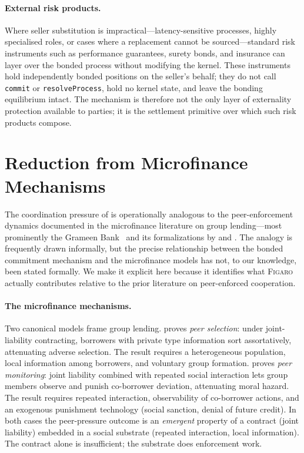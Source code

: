 \documentclass[11pt,a4paper]{article}
\theoremstyle{definition}
\theoremstyle{remark}
\newcommand{\figaro}{\textsc{Figaro}}
\begin{document}
\paragraph{External risk products.}
Where seller substitution is impractical---latency-sensitive
processes, highly specialised roles, or cases where a replacement
cannot be sourced---standard risk instruments such as performance
guarantees, surety bonds, and insurance can layer over the bonded
process without modifying the kernel. These instruments hold
independently bonded positions on the seller's behalf; they do not
call \texttt{commit} or \texttt{resolveProcess}, hold no kernel
state, and leave the bonding equilibrium intact. The mechanism is
therefore not the only layer of externality protection available to
parties; it is the settlement primitive over which such risk
products compose.

\section{Reduction from Microfinance Mechanisms}
\label{sec:microfinance}

The coordination pressure of  is
operationally analogous to the peer-enforcement dynamics documented
in the microfinance literature on group lending---most prominently
the Grameen Bank~\citep{grameen1999} and its formalizations by
\citet{ghatak1999} and \citet{stiglitz1990}. The analogy is frequently
drawn informally, but the precise relationship between the bonded
commitment mechanism and the microfinance models has not, to our
knowledge, been stated formally. We make it explicit here because
it identifies what \figaro{} actually contributes relative to the prior
literature on peer-enforced cooperation.

\paragraph{The microfinance mechanisms.}
Two canonical models frame group lending.
\citet{ghatak1999} proves \emph{peer selection}: under
joint-liability contracting, borrowers with private type information
sort assortatively, attenuating adverse selection. The result requires
a heterogeneous population, local information among borrowers, and
voluntary group formation.
\citet{stiglitz1990} proves \emph{peer monitoring}: joint liability
combined with repeated social interaction lets group members observe
and punish co-borrower deviation, attenuating moral hazard. The result
requires repeated interaction, observability of co-borrower actions,
and an exogenous punishment technology (social sanction, denial of
future credit). In both cases the peer-pressure outcome is an
\emph{emergent} property of a contract (joint liability) embedded in a
social substrate (repeated interaction, local information). The
contract alone is insufficient; the substrate does enforcement work.
\end{document}
